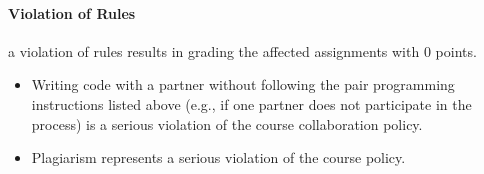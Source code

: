 \documentclass{cgsblatt}
\begin{document}
\paragraph{Violation of Rules} a violation of rules results in grading the affected assignments with $0$ points.
\begin{itemize}
\item Writing code with a partner without following the pair programming instructions listed above (e.g., if one partner does not participate in the process) is a serious violation of the course collaboration policy.
\item Plagiarism represents a serious violation of the course policy. 
\end{itemize}
\end{document}
